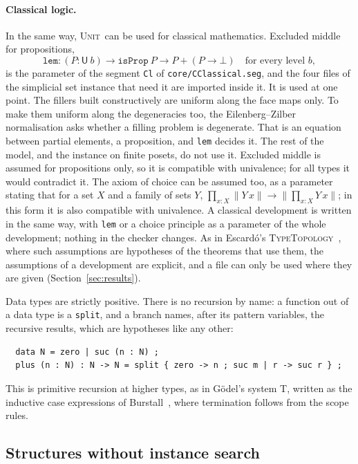 \documentclass[11pt]{article}
\newcommand{\sys}{\textsc{Unit}}
\newcommand{\kw}[1]{\texttt{#1}}
\newcommand{\U}{\mathsf{U}}
\begin{document}
\paragraph{Classical logic.} In the same way, \sys\ can be used for
classical mathematics. Excluded middle for propositions,
\[
\kw{lem} : (P : \U\ b) \to \kw{isProp}\ P \to P + (P\to\bot)\quad
\text{for every level } b,
\]
is the parameter of the segment \kw{Cl} of \texttt{core/CClassical.seg},
and the four files of the simplicial set instance that need it are
imported inside it.
It is used at one point. The fillers built constructively are uniform
along the face maps only. To make them uniform along the degeneracies
too, the Eilenberg--Zilber normalisation asks whether a filling problem
is degenerate. That is an equation between partial elements, a
proposition, and \kw{lem} decides it. The rest of the model, and the
instance on finite posets, do not use it. Excluded middle is assumed for
propositions only, so it is compatible with univalence; for all types
it would contradict it. The axiom of choice can be assumed too, as a parameter stating that for a set $X$ and a family of sets
$Y$, $\prod_{x:X}\lVert Y\,x\rVert\to\lVert\prod_{x:X}Y\,x\rVert$; in this
form it is also compatible with univalence. A classical development is written in the same
way, with \kw{lem} or a choice principle as a parameter of the whole
development; nothing in the checker changes. As in Escard\'o's
\textsc{TypeTopology}~\cite{TT}, where such assumptions are hypotheses
of the theorems that use them, the assumptions of a development are
explicit, and a file can only be used where they are given
(Section~\ref{sec:results}).

Data types are strictly positive. There is no recursion by name: a
function out of a data type is a \kw{split}, and a branch names, after
its pattern variables, the recursive results, which are hypotheses like
any other:
\begin{verbatim}
  data N = zero | suc (n : N) ;
  plus (n : N) : N -> N = split { zero -> n ; suc m | r -> suc r } ;
\end{verbatim}
This is primitive recursion at higher types, as in G\"odel's system T,
written as the inductive case expressions of Burstall~\cite{Burstall},
where termination follows from the scope rules.

\subsection{Structures without instance search}\label{sec:structures}
\end{document}
